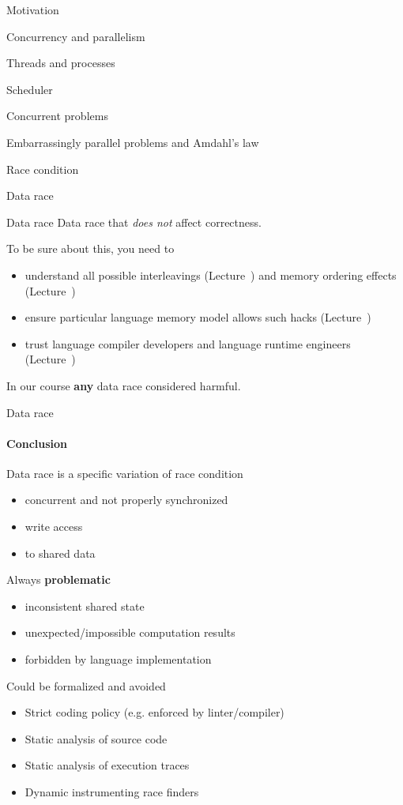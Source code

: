 \begin{section}{Motivation}
\begin{section}{Concurrency and parallelism}
\begin{section}{Threads and processes}
\begin{section}{Scheduler}
\begin{section}{Concurrent problems}
\begin{subsection}{Embarrassingly parallel problems and Amdahl's law}
\begin{subsection}{Race condition}
\begin{subsection}{Data race}
\begin{frame}{Data race}
Data race that \textit{does not} affect correctness.

To be sure about this, you need to
\begin{itemize}
    \item understand all possible interleavings (Lecture~\extraBasicsNum) and memory ordering effects (Lecture~\cacheCoherencyNum)
    \item ensure particular language memory model allows such hacks (Lecture~\langMMNum)
    \item trust language compiler developers and language runtime engineers (Lecture~\designNum)
\end{itemize}

In our course \textbf{any} data race considered harmful.

\end{frame}


\begin{frame}{Data race}
\framesubtitle{Conclusion}

Data race is a specific variation of race condition 
\begin{itemize}
    \item concurrent and not properly synchronized    
    \item write access
    \item to shared data 
\end{itemize}

Always \textbf{problematic}
\begin{itemize}
    \item inconsistent shared state
    \item unexpected/impossible computation results
    \item forbidden by language implementation
\end{itemize}

Could be formalized and avoided
\begin{itemize}
    \item Strict coding policy (e.g. enforced by linter/compiler)
    \item Static analysis of source code
    \item Static analysis of execution traces
    \item Dynamic instrumenting race finders
\end{itemize}
\end{frame}



\end{subsection}
\end{subsection}
\end{subsection}
\end{section}
\end{section}
\end{section}
\end{section}
\end{section}
